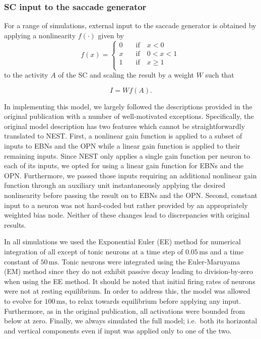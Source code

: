 \documentclass[10pt,a4paper,onecolumn]{article}
\begin{document}
\subsubsection{SC input to the saccade
generator}\label{sc-input-to-the-saccade-generator}

For a range of simulations, external input to the saccade generator is
obtained by applying a nonlinearity \(f(\cdot)\) given by
\begin{equation}
f(x) = 
\left\{
 \begin{array}{lll}
    0 \quad &\textrm{if} \quad x<0 \\
    x \quad &\textrm{if} \quad 0<x<1 \\
    1 \quad &\textrm{if} \quad x \geq 1 \\
  \end{array}
\right.\
\label{eq:pw}\end{equation} to the activity \(A\) of the SC and scaling
the result by a weight \(W\) such that

\begin{equation}
I = Wf(A)\textrm{.}
\label{eq:stim}\end{equation}

In implementing this model, we largely followed the descriptions
provided in the original publication with a number of well-motivated
exceptions. Specifically, the original model description has two
features which cannot be straightforwardly translated to NEST. First, a
nonlinear gain function is applied to a subset of inputs to EBNs and the
OPN while a linear gain function is applied to their remaining inputs.
Since NEST only applies a single gain function per neuron to each of its
inputs, we opted for using a linear gain function for EBNs and the OPN.
Furthermore, we passed those inputs requiring an additional nonlinear
gain function through an auxiliary unit instantaneously applying the
desired nonlinearity before passing the result on to EBNs and the OPN.
Second, constant input to a neuron was not hard-coded but rather
provided by an appropriately weighted bias node. Neither of these
changes lead to discrepancies with original results.

In all simulations we used the Exponential Euler (EE) method for
numerical integration of all except of tonic neurons
\autocite{Hahne2017} at a time step of \(0.05\,\mathrm{ms}\) and a time
constant of \(50\,\mathrm{ms}\). Tonic neurons were integrated using the
Euler-Maruyama (EM) method since they do not exhibit passive decay
leading to division-by-zero when using the EE method. It should be noted
that initial firing rates of neurons were not at resting equilibrium. In
order to address this, the model was allowed to evolve for
\(100\,\mathrm{ms}\), to relax towards equilibrium before applying any
input. Furthermore, as in the original publication, all activations were
bounded from below at zero. Finally, we always simulated the full model;
i.e.~both its horizontal and vertical components even if input was
applied only to one of the two.
\end{document}
